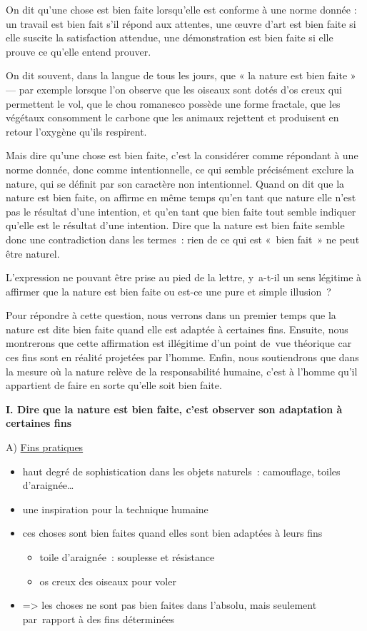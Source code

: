 \documentclass[a4paper,12pt]{article}
\begin{document}
On dit qu'une chose est bien faite lorsqu'elle est conforme à une norme
donnée : un travail est bien fait s'il répond aux attentes, une œuvre
d'art est bien faite si elle suscite la satisfaction attendue, une
démonstration est bien faite si elle prouve ce qu'elle entend prouver.

On dit souvent, dans la langue de tous les
jours, que « la nature est bien faite » — par exemple lorsque l'on
observe que les oiseaux sont dotés d'os creux qui permettent le vol, que
le chou romanesco possède une forme fractale, que les végétaux
consomment le carbone que les animaux rejettent et produisent en retour
l'oxygène qu'ils respirent.

Mais dire qu'une chose est bien faite, c'est la
considérer comme répondant à une norme donnée, donc comme
intentionnelle, ce qui semble précisément exclure la nature, qui se
définit par son caractère non intentionnel. Quand on dit que la nature
est bien faite, on affirme en même temps qu'en tant que nature elle
n'est pas le résultat d'une intention, et qu'en tant que bien faite tout
semble indiquer qu'elle est le résultat d'une intention. Dire que la
nature est bien faite semble donc une contradiction dans les termes :
rien de ce qui est « bien fait » ne peut être naturel.

L'expression ne pouvant être prise au pied de
la lettre, y a-t-il un sens légitime à affirmer que la nature est bien
faite ou est-ce une pure et simple illusion ?

Pour répondre à cette question, nous verrons dans un
premier temps que la nature est dite bien faite quand elle est adaptée à
certaines fins. Ensuite, nous montrerons que cette affirmation est
illégitime d'un point de vue théorique car ces fins sont en réalité
projetées par l'homme. Enfin, nous soutiendrons que dans la mesure où la
nature relève de la responsabilité humaine, c'est à l'homme qu'il
appartient de faire en sorte qu'elle soit bien faite.

\bigskip

\textbf{I. Dire que la nature est bien faite, c'est observer son adaptation à
certaines fins}


\medskip

A) \uline{Fins pratiques}
\begin{itemize}
\item haut degré de sophistication dans les objets naturels : camouflage,
toiles d'araignée\ldots{}
\item une inspiration pour la technique humaine
\item ces choses sont bien faites quand elles sont bien adaptées à leurs
fins
\begin{itemize}
\item toile d'araignée : souplesse et résistance
\item os creux des oiseaux pour voler
\end{itemize}
\item => les choses ne sont pas bien faites dans l'absolu, mais seulement
par rapport à des fins déterminées
\end{itemize}
\end{document}
